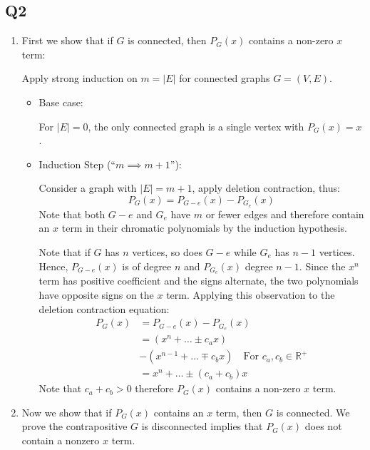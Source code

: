 \documentclass[a4paper, 11pt]{article}
\newcommand{\RR}{\mathbb{R}}
\def\abs#1{\left|#1\right|}
\begin{document}
\begin{multicols*}{2}
	\subsection*{Q2}

	\begin{enumerate}[label=(\alph*)]
		\item
		      First we show that if $G$ is connected, then $P_G(x)$ contains a non-zero $x$ term:

		      Apply strong induction on $m=\abs{E}$ for connected graphs $G=(V,E)$.
		      \begin{itemize}
			      \item Base case:

			            For $\abs{E}=0$, the only connected graph is a single vertex with $P_G(x)=x$.

			      \item Induction Step (``$m\implies m+1$''):

			            Consider a graph with $\abs{E}=m+1$, apply deletion contraction, thus:
			            $$P_G(x)= P_{G-e}(x) - P_{G_e}(x)$$
			            Note that both $G-e$ and $G_e$ have $m$ or fewer edges and therefore contain an $x$ term in their chromatic polynomials by the induction hypothesis.

			            Note that if $G$ has $n$ vertices, so does $G-e$ while $G_e$ has $n-1$ vertices. Hence, $P_{G-e}(x)$ is of degree $n$ and $P_{G_e}(x)$ degree $n-1$. Since the $x^n$ term has positive coefficient and the signs alternate, the two polynomials have opposite signs on the $x$ term. Applying this observation to the deletion contraction equation:
			            \begin{align*}
				            P_G(x) & = P_{G-e}(x) - P_{G_e}(x)      \\
				                   & = (x^n + \dots \pm c_a x )     \\
				                   & -  (x^{n-1} + \dots \mp c_b x)
				            \quad\text{For $c_a,c_b\in\RR^+$}       \\
				                   & = x^n + \dots \pm (c_a + c_b)x
			            \end{align*}
			            Note that $c_a+c_b > 0$ therefore $P_G(x)$ contains a non-zero $x$ term.

		      \end{itemize}

		\item
		      Now we show that if $P_G(x)$ contains an $x$ term, then $G$ is connected. We prove the contrapositive $G$ is disconnected implies that $P_G(x)$ does not contain a nonzero $x$ term.


\end{enumerate}
\end{multicols*}
\end{document}
